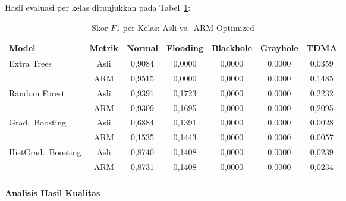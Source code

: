 Hasil evaluasi per kelas ditunjukkan pada Tabel~\ref{tab:per_class_f1}:

\begin{table}[htbp]
\centering
\caption{Skor $F1$ per Kelas: Asli vs.\ ARM-Optimized}
\label{tab:per_class_f1}
\begin{tabular}{lcccccc}
\hline
\textbf{Model} & \textbf{Metrik} & \textbf{Normal} & \textbf{Flooding} & \textbf{Blackhole} & \textbf{Grayhole} & \textbf{TDMA} \\
\hline
\multirow{2}{*}{Extra Trees} 
  & Asli & 0,9084 & 0,0000 & 0,0000 & 0,0000 & 0,0359 \\
  & ARM  & 0,9515 & 0,0000 & 0,0000 & 0,0000 & 0,1485 \\
\hline
\multirow{2}{*}{Random Forest} 
  & Asli & 0,9391 & 0,1723 & 0,0000 & 0,0000 & 0,2232 \\
  & ARM  & 0,9309 & 0,1695 & 0,0000 & 0,0000 & 0,2095 \\
\hline
\multirow{2}{*}{Grad.\ Boosting} 
  & Asli & 0,6884 & 0,1391 & 0,0000 & 0,0000 & 0,0028 \\
  & ARM  & 0,1535 & 0,1443 & 0,0000 & 0,0000 & 0,0057 \\
\hline
\multirow{2}{*}{HistGrad.\ Boosting} 
  & Asli & 0,8740 & 0,1408 & 0,0000 & 0,0000 & 0,0239 \\
  & ARM  & 0,8731 & 0,1408 & 0,0000 & 0,0000 & 0,0234 \\
\hline
\end{tabular}
\end{table}

\paragraph{Analisis Hasil Kualitas}

